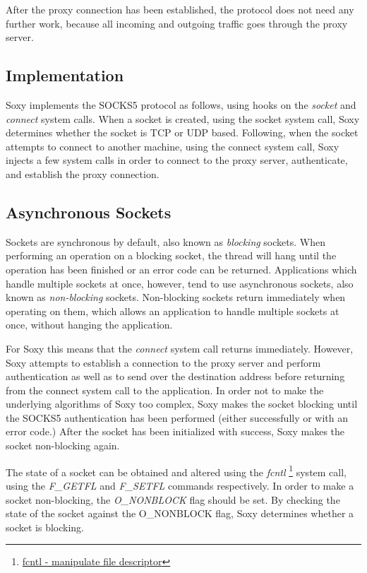 \documentclass[a4paper, 10pt]{report}
\begin{document}
After the proxy connection has been established, the protocol does not need
any further work, because all incoming and outgoing traffic goes through the
proxy server.

\subsection{Implementation}

Soxy implements the SOCKS5 protocol as follows, using hooks on the
\textit{socket} and \textit{connect} system calls. When a
socket is created, using the socket system call, Soxy determines whether the
socket is TCP or UDP based. Following, when the socket attempts to connect to
another machine, using the connect system call, Soxy injects a few system
calls in order to connect to the proxy server, authenticate, and establish the
proxy connection.

\subsection{Asynchronous Sockets}

Sockets are synchronous by default, also known as \textit{blocking} sockets.
When performing an operation on a blocking socket, the thread will hang until
the operation has been finished or an error code can be returned. Applications
which handle multiple sockets at once, however, tend to use asynchronous
sockets, also known as \textit{non-blocking} sockets. Non-blocking sockets
return immediately when operating on them, which allows an application to
handle multiple sockets at once, without hanging the application.

For Soxy this means that the \textit{connect} system call returns immediately.
However, Soxy attempts to establish a connection to the proxy server and
perform authentication as well as to send over the destination address before
returning from the connect system call to the application. In order not to
make the underlying algorithms of Soxy too complex, Soxy makes the socket
blocking until the SOCKS5 authentication has been performed (either
successfully or with an error code.) After the socket has been initialized
with success, Soxy makes the socket non-blocking again.

The state of a socket can be obtained and altered using the \textit{fcntl}
\footnote{\href{http://linux.die.net/man/2/fcntl}{fcntl - manipulate file
descriptor}} system call, using the \textit{F\_GETFL} and \textit{F\_SETFL}
commands respectively. In order to make a socket non-blocking, the
\textit{O\_NONBLOCK} flag should be set. By checking the state of the socket
against the O\_NONBLOCK flag, Soxy determines whether a socket is blocking.
\end{document}
